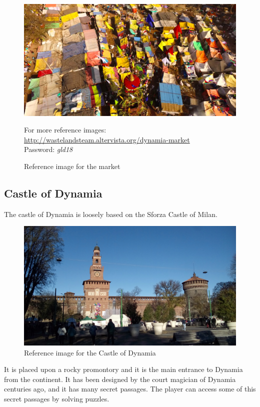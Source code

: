 \begin{figure}[H]
  \centering
  \includegraphics[width=\textwidth]{Images/Landmarks/market}

  \caption{Reference image for the market}
    For more reference images: \href{http://wastelandsteam.altervista.org/dynamia-dead-end}{http://wastelandsteam.altervista.org/dynamia-market}\\Password: \textit{gld18}
\end{figure}

\subsection{Castle of Dynamia}
The castle of Dynamia is loosely based on the Sforza Castle of Milan.

\begin{figure}[H]
  \centering
  \includegraphics[width=\textwidth]{../../../References/Images/Dynamia/CastleOfDynamia/20181208_100357}
  \caption{Reference image for the Castle of Dynamia}
\end{figure}

It is placed upon a rocky promontory and it is the main entrance to Dynamia from the continent. It has been designed by the court magician of Dynamia centuries ago, and it has many secret passages. The player can access some of this secret passages by solving puzzles.

